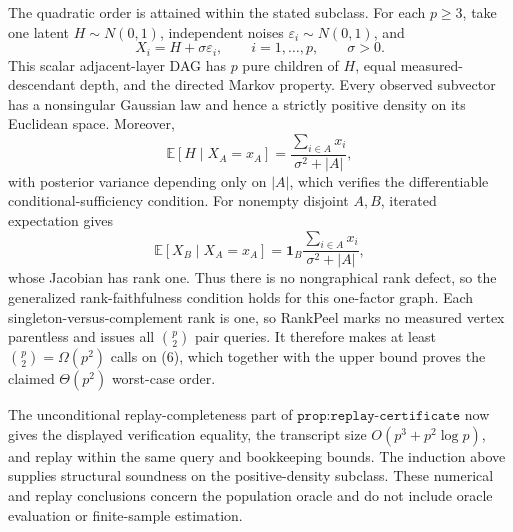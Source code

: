 The quadratic order is attained within the stated subclass.  For each \(p\geq3\), take one latent \(H\sim N(0,1)\), independent noises \(\varepsilon_i\sim N(0,1)\), and
\[
 X_i=H+\sigma\varepsilon_i,
 \qquad i=1,\ldots,p,
 \qquad \sigma>0. \tag{6}
\]
This scalar adjacent-layer DAG has \(p\) pure children of \(H\), equal measured-descendant depth, and the directed Markov property.  Every observed subvector has a nonsingular Gaussian law and hence a strictly positive density on its Euclidean space.  Moreover,
\[
 \mathbb E[H\mid X_A=x_A]
 =\frac{\sum_{i\in A}x_i}{\sigma^2+|A|}, \tag{7}
\]
with posterior variance depending only on \(|A|\), which verifies the differentiable conditional-sufficiency condition.  For nonempty disjoint \(A,B\), iterated expectation gives
\[
 \mathbb E[X_B\mid X_A=x_A]
 =\mathbf 1_B\frac{\sum_{i\in A}x_i}{\sigma^2+|A|}, \tag{8}
\]
whose Jacobian has rank one.  Thus there is no nongraphical rank defect, so the generalized rank-faithfulness condition holds for this one-factor graph.  Each singleton-versus-complement rank is one, so RankPeel marks no measured vertex parentless and issues all \(\binom p2\) pair queries.  It therefore makes at least \(\binom p2=\Omega(p^2)\) calls on (6), which together with the upper bound proves the claimed \(\Theta(p^2)\) worst-case order.

The unconditional replay-completeness part of \(\texttt{prop:replay-certificate}\) now gives the displayed verification equality, the transcript size \(O(p^3+p^2\log p)\), and replay within the same query and bookkeeping bounds.  The induction above supplies structural soundness on the positive-density subclass.  These numerical and replay conclusions concern the population oracle and do not include oracle evaluation or finite-sample estimation.
